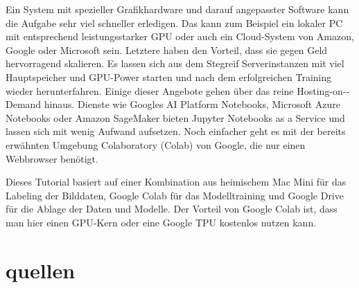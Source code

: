 Ein System mit spezieller Grafikhardware und darauf angepasster Software kann die Aufgabe sehr viel schneller erledigen. Das kann zum Beispiel ein lokaler PC mit entsprechend leistungsstarker GPU oder auch ein Cloud-System von Amazon, Google oder Microsoft sein. Letztere haben den Vorteil, dass sie gegen Geld hervorragend skalieren. Es lassen sich aus dem Stegreif Serverinstanzen mit viel Hauptspeicher und GPU-Power starten und nach dem erfolgreichen Training wieder herunterfahren. Einige dieser Angebote gehen über das reine Hosting-on-­Demand hinaus. Dienste wie Googles AI Platform Notebooks, Microsoft Azure Notebooks oder Amazon SageMaker bieten Jupyter Notebooks as a Service und lassen sich mit wenig Aufwand aufsetzen. Noch einfacher geht es mit der bereits erwähnten Umgebung Colaboratory (Colab) von Google, die nur einen Webbrowser benötigt. 

Dieses Tutorial basiert auf einer Kombination aus heimischem Mac Mini für das Labeling der Bilddaten, Google Colab für das Modelltraining und Google Drive für die Ablage der Daten und Modelle. Der Vorteil von Google Colab ist, dass man hier einen GPU-Kern oder eine Google TPU kostenlos nutzen kann. 


\section{quellen}

